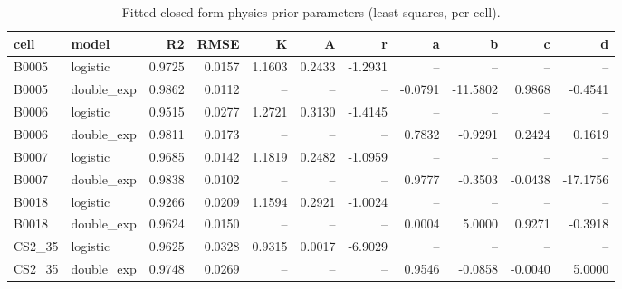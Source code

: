 \begin{table}
\caption{Fitted closed-form physics-prior parameters (least-squares, per cell).}
\label{tab:physics_prior_parameters}
\begin{tabular}{llrrrrrrrrr}
\toprule
cell & model & R2 & RMSE & K & A & r & a & b & c & d \\
\midrule
B0005 & logistic & 0.9725 & 0.0157 & 1.1603 & 0.2433 & -1.2931 & -- & -- & -- & -- \\
B0005 & double\_exp & 0.9862 & 0.0112 & -- & -- & -- & -0.0791 & -11.5802 & 0.9868 & -0.4541 \\
B0006 & logistic & 0.9515 & 0.0277 & 1.2721 & 0.3130 & -1.4145 & -- & -- & -- & -- \\
B0006 & double\_exp & 0.9811 & 0.0173 & -- & -- & -- & 0.7832 & -0.9291 & 0.2424 & 0.1619 \\
B0007 & logistic & 0.9685 & 0.0142 & 1.1819 & 0.2482 & -1.0959 & -- & -- & -- & -- \\
B0007 & double\_exp & 0.9838 & 0.0102 & -- & -- & -- & 0.9777 & -0.3503 & -0.0438 & -17.1756 \\
B0018 & logistic & 0.9266 & 0.0209 & 1.1594 & 0.2921 & -1.0024 & -- & -- & -- & -- \\
B0018 & double\_exp & 0.9624 & 0.0150 & -- & -- & -- & 0.0004 & 5.0000 & 0.9271 & -0.3918 \\
CS2\_35 & logistic & 0.9625 & 0.0328 & 0.9315 & 0.0017 & -6.9029 & -- & -- & -- & -- \\
CS2\_35 & double\_exp & 0.9748 & 0.0269 & -- & -- & -- & 0.9546 & -0.0858 & -0.0040 & 5.0000 \\
\bottomrule
\end{tabular}
\end{table}
